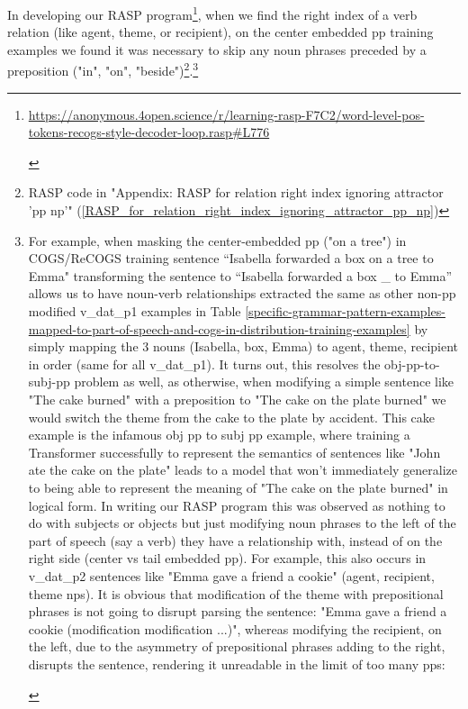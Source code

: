 \documentclass[11pt]{article}
\begin{document}
In developing our RASP program\footnote{\begin{footnotesize}\href{https://anonymous.4open.science/r/learning-rasp-F7C2/word-level-pos-tokens-recogs-style-decoder-loop.rasp\#L776}{https://anonymous.4open.science/r/learning-rasp-F7C2/word-level-pos-tokens-recogs-style-decoder-loop.rasp\#L776}\end{footnotesize}},
when we find the right index of a verb relation (like agent, theme, or recipient), 
on the center embedded pp training examples we found it was necessary to skip any noun phrases preceded by a preposition ("in", "on", "beside")\footnote{RASP code in "Appendix: RASP for relation right index ignoring attractor 'pp np'" (\ref{RASP_for_relation_right_index_ignoring_attractor_pp_np})}.\footnote{\begin{footnotesize}
For example, when masking the center-embedded pp ("on a tree") in COGS/ReCOGS training sentence “Isabella forwarded a box on a tree to Emma" transforming the sentence to “Isabella forwarded a box \_ to Emma” allows us to have noun-verb relationships extracted the same as other non-pp modified v\_dat\_p1 examples in Table \ref{specific-grammar-pattern-examples-mapped-to-part-of-speech-and-cogs-in-distribution-training-examples} by simply mapping the 3 nouns (Isabella, box, Emma) to agent, theme, recipient in order (same for all v\_dat\_p1).
It turns out, this resolves the obj-pp-to-subj-pp problem as well, as otherwise, when modifying a simple sentence like "The cake burned" with a preposition to "The cake on the plate burned" we would switch the theme from the cake to the plate by accident. This cake example is the infamous obj pp to subj pp example, where training a Transformer successfully to represent the semantics of sentences like "John ate the cake on the plate" leads to a model that won't immediately generalize to being able to represent the meaning of "The cake on the plate burned" in logical form.
In writing our RASP program this was observed as nothing to do with subjects or objects but just modifying noun phrases to the left of the part of speech (say a verb) they have a relationship with, instead of on the right side (center vs tail embedded pp). For example, this also occurs in v\_dat\_p2 sentences like "Emma gave a friend a cookie" (agent, recipient, theme nps). It is obvious that modification of the theme with prepositional phrases is not going to disrupt parsing the sentence: "Emma gave a friend a cookie (modification modification ...)", whereas modifying the recipient, on the left, due to the asymmetry of prepositional phrases adding to the right, disrupts the sentence, rendering it unreadable in the limit of too many pps:


\end{footnotesize}}
\end{document}

